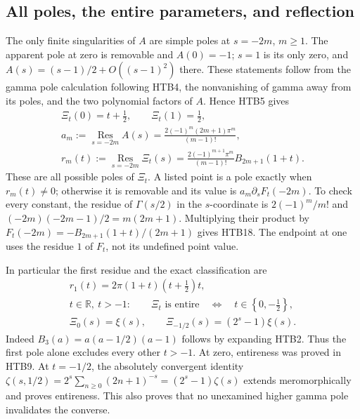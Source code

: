 \subsection{All poles, the entire parameters, and reflection}

The only finite singularities of $A$ are simple poles at $s=-2m$,
$m\ge1$. The apparent pole at zero is removable and $A(0)=-1$;
$s=1$ is its only zero, and
$A(s)=(s-1)/2+O((s-1)^2)$ there. These statements follow from the
gamma pole calculation following HTB4, the nonvanishing of gamma
away from its poles, and the two polynomial factors of $A$. Hence
HTB5 gives
\begin{equation}\tag{HTB18}
\begin{gathered}
 \Xi_t(0)=t+\frac12,\qquad \Xi_t(1)=\frac12,\\
 a_m:=\operatorname*{Res}_{s=-2m}A(s)
   =\frac{2(-1)^m(2m+1)\pi^m}{(m-1)!},\\
 r_m(t):=\operatorname*{Res}_{s=-2m}\Xi_t(s)
   =\frac{2(-1)^{m+1}\pi^m}{(m-1)!}B_{2m+1}(1+t).
\end{gathered}
\end{equation}
These are all possible poles of $\Xi_t$. A listed point is a pole
exactly when $r_m(t)\ne0$; otherwise it is removable and its value is
$a_m\partial_sF_t(-2m)$. To check every constant, the residue of
$\Gamma(s/2)$ in the $s$-coordinate is $2(-1)^m/m!$ and
$(-2m)(-2m-1)/2=m(2m+1)$. Multiplying their product by
$F_t(-2m)=-B_{2m+1}(1+t)/(2m+1)$ gives HTB18. The endpoint at one
uses the residue $1$ of $F_t$, not its undefined point value.

In particular the first residue and the exact classification are
\begin{equation}\tag{HTB19}
\begin{gathered}
 r_1(t)=2\pi(1+t)\left(t+\frac12\right)t,\\
 t\in\mathbb R,\ t>-1:\qquad
 \Xi_t\text{ is entire}\quad\Longleftrightarrow\quad
 t\in\left\{0,-\frac12\right\},\\
 \Xi_0(s)=\xi(s),\qquad
 \Xi_{-1/2}(s)=(2^s-1)\xi(s).
\end{gathered}
\end{equation}
Indeed $B_3(a)=a(a-1/2)(a-1)$ follows by expanding HTB2. Thus the
first pole alone excludes every other $t>-1$. At zero, entireness was
proved in HTB9. At $t=-1/2$, the absolutely convergent identity
$\zeta(s,1/2)=2^s\sum_{n\ge0}(2n+1)^{-s}=(2^s-1)\zeta(s)$
extends meromorphically and proves entireness. This also proves that
no unexamined higher gamma pole invalidates the converse.

